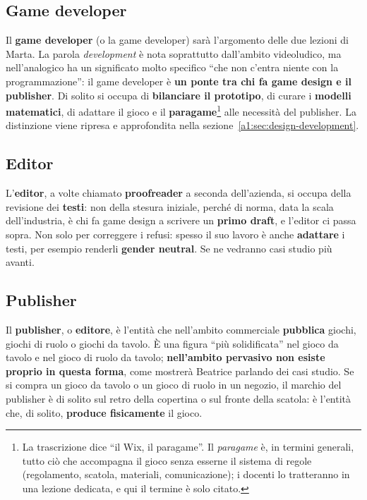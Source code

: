 \subsection{Game developer}

Il \textbf{game developer} (o la game developer) sarà l'argomento delle due
lezioni di Marta. La parola \emph{development} è nota soprattutto
dall'ambito videoludico, ma nell'analogico ha un significato molto specifico
``che non c'entra niente con la programmazione'': il game developer è
\textbf{un ponte tra chi fa game design e il publisher}. Di solito si occupa di
\textbf{bilanciare il prototipo}, di curare i \textbf{modelli matematici}, di
adattare il gioco e il \textbf{paragame}\footnote{La trascrizione dice ``il
Wix, il paragame''. Il \emph{paragame} è, in termini generali, tutto ciò che
accompagna il gioco senza esserne il sistema di regole (regolamento, scatola,
materiali, comunicazione); i docenti lo tratteranno in una lezione dedicata, e
qui il termine è solo citato.} alle necessità del publisher. La distinzione
viene ripresa e approfondita nella sezione~\ref{a1:sec:design-development}.

\subsection{Editor}

L'\textbf{editor}, a volte chiamato \textbf{proofreader} a seconda dell'azienda,
si occupa della revisione dei \textbf{testi}: non della stesura iniziale, perché
di norma, data la scala dell'industria, è chi fa game design a scrivere un
\textbf{primo draft}, e l'editor ci passa sopra. Non solo per correggere i
refusi: spesso il suo lavoro è anche \textbf{adattare} i testi, per esempio
renderli \textbf{gender neutral}. Se ne vedranno casi studio più avanti.

\subsection{Publisher}

Il \textbf{publisher}, o \textbf{editore}, è l'entità che nell'ambito
commerciale \textbf{pubblica} giochi, giochi di ruolo o giochi da tavolo. È una
figura ``più solidificata'' nel gioco da tavolo e nel gioco di ruolo da tavolo;
\textbf{nell'ambito pervasivo non esiste proprio in questa forma}, come
mostrerà Beatrice parlando dei casi studio. Se si compra un gioco da tavolo o un
gioco di ruolo in un negozio, il marchio del publisher è di solito sul retro
della copertina o sul fronte della scatola: è l'entità che, di solito,
\textbf{produce fisicamente} il gioco.

